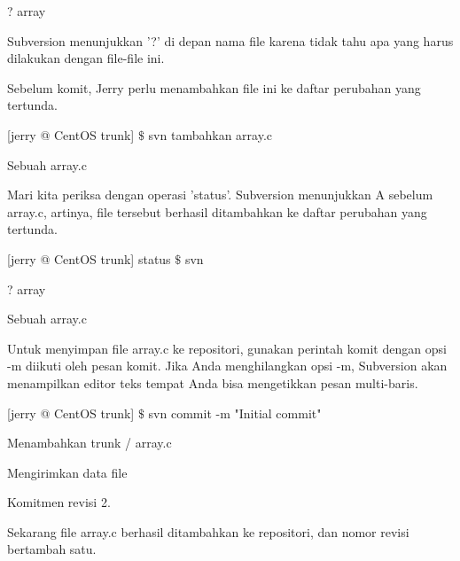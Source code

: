 \noindent 
 \hspace*{0.5in} ? array \par
 \vspace{\baselineskip}
\noindent 
Subversion menunjukkan '?' di depan nama file karena tidak tahu apa yang harus dilakukan dengan file-file ini. \par
\noindent 
Sebelum komit, Jerry perlu menambahkan file ini ke daftar perubahan yang tertunda. \par
\vspace{\baselineskip}
\vspace{\baselineskip}
\noindent 
 \hspace*{0.5in} [jerry @ CentOS trunk]  $  \$  $ svn tambahkan array.c \par
 \vspace{\baselineskip}
\noindent 
 \hspace*{0.5in} Sebuah array.c \par
 \vspace{\baselineskip}
\noindent 
Mari kita periksa dengan operasi 'status'. Subversion menunjukkan A sebelum array.c, artinya, file tersebut berhasil ditambahkan ke daftar perubahan yang tertunda. \par
\vspace{\baselineskip}
\noindent 
 \hspace*{0.5in} [jerry @ CentOS trunk] status  $  \$  $ svn \par
\noindent 
 \hspace*{0.5in} ? array \par
 \vspace{\baselineskip}
\noindent 
Sebuah array.c \par
\vspace{\baselineskip}
\noindent 
Untuk menyimpan file array.c ke repositori, gunakan perintah komit dengan opsi -m diikuti oleh pesan komit. Jika Anda menghilangkan opsi -m, Subversion akan menampilkan editor teks tempat Anda bisa mengetikkan pesan multi-baris. \par
\vspace{\baselineskip}
\noindent 
 \hspace*{0.5in} \vspace{12pt}
\noindent 
 \hspace*{0.5in} [jerry @ CentOS trunk]  $  \$  $ svn commit -m "Initial commit" \par
\noindent 
 \hspace*{0.5in} Menambahkan trunk / array.c \par
\noindent 
 \hspace*{0.5in} Mengirimkan data file \par
\noindent 
 \hspace*{0.5in} Komitmen revisi 2. \par
\noindent 
 \hspace*{0.5in} Sekarang file array.c berhasil ditambahkan ke repositori, dan nomor revisi bertambah satu. \par

